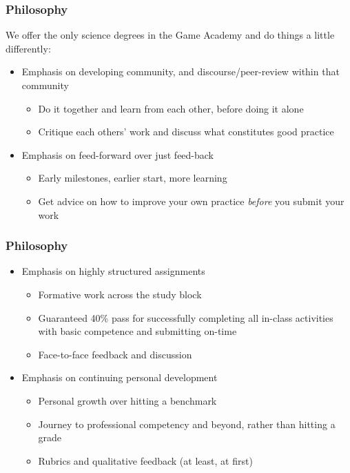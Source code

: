 \begin{frame}
	\frametitle{Philosophy}
	
	We offer the only science degrees in the Game Academy and do things a little differently:
	
	\begin{itemize}
		\pause\item Emphasis on developing community, and discourse/peer-review within that community
		\begin{itemize}
			\item Do it together and learn from each other, before doing it alone
			\item Critique each others' work and discuss what constitutes good practice
		\end{itemize}
		\pause\item Emphasis on feed-forward over just feed-back
		\begin{itemize}
			\item Early milestones, earlier start, more learning
			\item Get advice on how to improve your own practice \textit{before} you submit your work
		\end{itemize}
	\end{itemize}
\end{frame}

\begin{frame}
	\frametitle{Philosophy}
	
	\begin{itemize}
		\item Emphasis on highly structured assignments 
		\begin{itemize}
			\item Formative work across the study block
			\item Guaranteed 40\% pass for successfully completing all in-class activities with basic competence and submitting on-time
			\item Face-to-face feedback and discussion			
		\end{itemize}
		\pause\item Emphasis on continuing personal development
		\begin{itemize}
			\item Personal growth over hitting a benchmark
			\item Journey to professional competency and beyond, rather than hitting a grade
			\item Rubrics and qualitative feedback (at least, at first)			
		\end{itemize}
	\end{itemize}
\end{frame}

